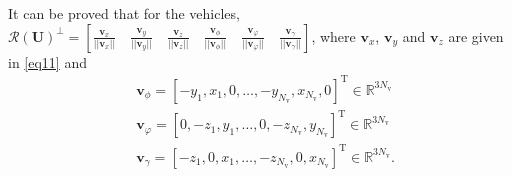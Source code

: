 \documentclass{IEEEtran}
\begin{document}
It can be proved that for the vehicles,
$\mathcal{R}(\mathbf{U})^\perp=[\frac{\mathbf{v}_x}{||\mathbf{v}_x||}\quad \frac{\mathbf{v}_y}{||\mathbf{v}_y||}\quad \frac{\mathbf{v}_z}{||\mathbf{v}_z||} \quad  \frac{\mathbf{v}_\phi}{||\mathbf{v}_\phi||}\quad \frac{\mathbf{v}_\varphi}{||\mathbf{v}_\varphi||} \quad  \frac{\mathbf{v}_\gamma}{||\mathbf{v}_\gamma||}]$, where $\mathbf{v}_x$, $\mathbf{v}_y$ and $\mathbf{v}_z$ are given in \eqref{eq11} and
\begin{equation}\label{19}
\begin{aligned}
&\mathbf{v}_\phi=[-y_1, x_1,0,\dots, -y_{N_{\text{v}}}, x_{N_{\text{v}}},0]^{\text{T}}\in \mathbb{R}^{3N_{\text{v}}}\\
&\mathbf{v}_\varphi=[0,-z_1, y_1,\dots,0,-z_{N_{\text{v}}}, y_{N_{\text{v}}}]^{\text{T}}\in \mathbb{R}^{3N_{\text{v}}}\\
&\mathbf{v}_\gamma=[-z_1,0, x_1,\dots, -z_{N_{\text{v}}}, 0,x_{N_{\text{v}}}]^{\text{T}}\in \mathbb{R}^{3N_{\text{v}}}.
\end{aligned}
\end{equation}
\end{document}
